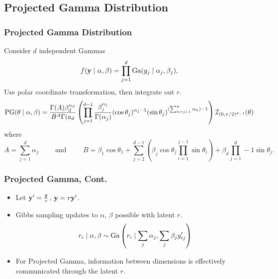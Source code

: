 \documentclass[aspectratio=169]{beamer}
\begin{document}
\subsection{Projected Gamma Distribution}

\begin{frame}
  \frametitle{Projected Gamma Distribution}
  Consider $d$ independent Gammas
  \begin{equation}
      f({\bf y}\mid{\bf \alpha},{\bf \beta}) = \prod_{j = 1}^d\text{Ga}(y_j\mid\alpha_j,\beta_j),
  \end{equation}
  Use polar coordinate transformation, then integrate out $r$.
  \begin{equation}
      \text{PG}({\bf \theta}\mid{\bf \alpha},{\bf \beta}) = \frac{\Gamma(A)\beta_d^{\alpha_d}}{B^A
      \Gamma(a_d}\left(\prod_{j = 1}^{d-1}\frac{\beta_j^{\alpha_j}}{\Gamma(\alpha_j)}(\cos\theta_j
      )^{\alpha_j - 1}(\sin\theta_j)^{(\sum_{h = j + 1}^d\alpha_h) - 1}\right)\mathcal{I}_{(0,\pi/2
      )^{d-1}}({\bf \theta})
  \end{equation}
  where
  \begin{equation}
      A = \sum_{j = 1}^d\alpha_j \hspace{1cm}\text{and}\hspace{1cm}
      B = \beta_1\cos\theta_1 + \sum_{j = 2}^{d-1}\left(\beta_j\cos\theta_j\prod_{
          i = 1}^{j-1}\sin\theta_i\right) + \beta_d\prod_{j = 1}^d-1\sin\theta_j.
  \end{equation}
\end{frame}

\begin{frame}
  \frametitle{Projected Gamma, Cont.}
  \begin{itemize}
    \item Let ${\bf y}^{\prime} = \frac{{\bf y}}{r}$, ${\bf y} = r{\bf y}^{\prime}$.
    \item Gibbs sampling updates to $\alpha$, $\beta$ possible with latent $r$.
      \begin{equation*}
        r_i\mid {\bf \alpha}, {\bf \beta} \sim \text{Ga}\left(r_i\mid  \sum_j\alpha_j, \sum_j \beta_jy_{ij}^{\prime}  \right)
      \end{equation*}
    \item For Projected Gamma, information between dimensions is effectively communicated through the latent $r$.
  \end{itemize}
\end{frame}
\end{document}
